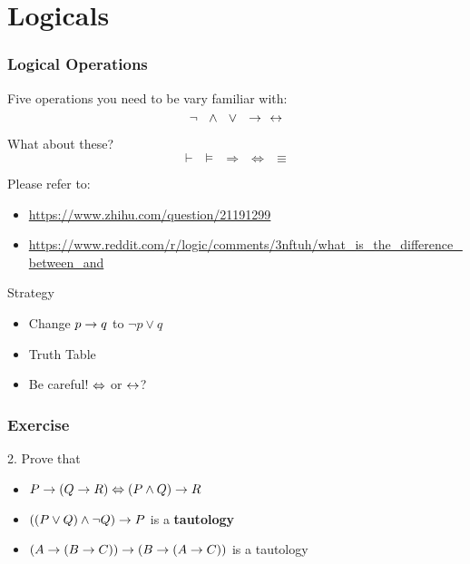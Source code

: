 \documentclass[xcolor=table]{beamer}
\begin{document}
\section{Logicals}
\begin{frame}
    \frametitle{Logical Operations}
    Five operations you need to be vary familiar with:
    $$\neg ~~\wedge ~~\vee ~~  \rightarrow ~~  \leftrightarrow$$

    What about these?
    $$\vdash ~~ \models ~~ \Rightarrow ~~ \Leftrightarrow ~~ \equiv$$

    Please refer to:
    \begin{itemize}
        \item \url{https://www.zhihu.com/question/21191299}
        \item \url{https://www.reddit.com/r/logic/comments/3nftuh/what_is_the_difference_between_and}
    \end{itemize}
    \begin{block}{Strategy}
        \begin{itemize}
            \item Change $p \rightarrow q$ to $\neg p \vee q$
            \item Truth Table
            \item Be careful! $\Leftrightarrow$ or $\leftrightarrow$?
        \end{itemize}
    \end{block}
\end{frame}
\begin{frame}
    \frametitle{Exercise}
    2. Prove that
    \begin{itemize}
        \item $P \rightarrow (Q \rightarrow R) \Leftrightarrow (P \wedge Q) \rightarrow R$
        \item $((P \vee Q) \wedge \neg Q) \rightarrow P$ is a \textbf{\textcolor[rgb]{0,0.6,0.2}{tautology}}
        \item $(A\rightarrow(B\rightarrow C))\rightarrow (B\rightarrow(A\rightarrow C))$ is a tautology
    \end{itemize}
    \vv \vv
\end{frame}
\end{document}
